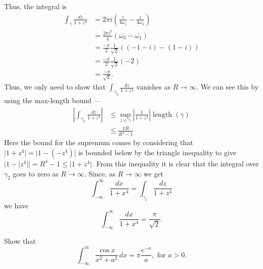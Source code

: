 \documentclass[12 pt, letterpaper]{hmcpset}
\begin{document}
\begin{solution}
	Thus, the integral is
	\[
		\begin{split}
			\int_{\gamma} \frac{dz}{1 + z^{4}} & = 2 \pi i \left ( \frac{i}{4 \omega_{1}} - \frac{i}{4 \omega_{3}} \right ) \\
							   & = \frac{2 \pi i^{2}}{4} (\overline{\omega_{3}} - \overline{\omega_{1}}) \\
							   & = \frac{- \pi}{2} \frac{1}{\sqrt{2}} ((-1 - i) - (1 - i)) \\
							   & = \frac{- \pi}{2} \frac{1}{\sqrt{2}} (-2) \\
							   & = \frac{- \pi}{\sqrt{2}}.
		\end{split}
	\]
	Thus, we only need to show that $\int_{\gamma_{2}} \frac{dz}{1 + z^{4}}$ vanishes as $R \to \infty$. We can see this by using the max-length bound ---
	\[
		\begin{split}
			\left \lvert \int_{\gamma_{2}} \frac{dz}{1 + z^{4}} \right \rvert & \le \sup_{z \in \gamma} \left \lvert \frac{1}{1 + z^{4}} \right \rvert \operatorname{length}(\gamma) \\
											  & \le \frac{\pi R}{R^{4} - 1}
		\end{split}
	\]
	Here the bound for the supremum comes by considering that $\lvert 1 + z^{4} \rvert = \lvert 1 - (- z^{4}) \rvert$ is bounded below by the triangle inequality to give $\lvert 1 - \lvert z^{4} \rvert \rvert = R^{4} - 1 \le \lvert 1 + z^{4} \rvert$. From this inequality it is clear that the integral over  $\gamma_{2}$ goes to zero as $R \to \infty$. Since, as $R \to \infty$ we get
	\[
		\int_{-\infty}^{\infty} \frac{dx}{1 + x^{4}} = \int_{\gamma_{1}} \frac{dz}{1 + z^{4}}
	\]
	we have
	\[
		\int_{-\infty}^{\infty} \frac{dx}{1 + x^{4}} = \frac{\pi}{\sqrt{2}}.
	\]
\end{solution}

\pagebreak

\begin{problem}[3]
	Show that
	\[
		\int_{-\infty}^{\infty} \frac{\cos{x}}{x^{2} + a^{2}} \, dx = \pi \frac{e^{-a}}{a}, \text{ for } a > 0.
	\]
\end{problem}
\end{document}
